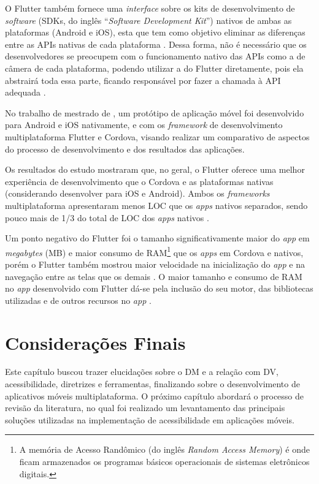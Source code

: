 O Flutter também fornece uma \emph{interface} sobre os kits de desenvolvimento de \emph{software} (SDKs, do inglês ``\emph{Software Development Kit}'')
nativos de ambas as plataformas (Android e iOS), esta que tem como objetivo eliminar as diferenças entre as APIs nativas de cada plataforma \cite{zammetti2019practical}.
Dessa forma, não é necessário que os desenvolvedores se preocupem com o funcionamento nativo das APIs como a de câmera de cada plataforma, podendo utilizar
a do Flutter diretamente, pois ela abstrairá toda essa parte, ficando responsável por fazer a chamada à API adequada \cite{zammetti2019practical}.

No trabalho de mestrado de , um protótipo de aplicação móvel foi desenvolvido para Android e iOS nativamente, e com os
\emph{framework} de desenvolvimento multiplataforma Flutter e Cordova, visando realizar um comparativo de
aspectos do processo de desenvolvimento e dos resultados das aplicações. 

Os resultados do estudo mostraram que, no geral, o Flutter oferece uma melhor experiência de desenvolvimento que o Cordova e as plataformas nativas
(considerando desenvolver para iOS e Android). Ambos os \emph{frameworks} multiplataforma apresentaram menos LOC que os \emph{apps} nativos separados,
sendo pouco mais de 1/3 do total de LOC dos \emph{apps} nativos \cite{gonsalves2019evaluating}.

Um ponto negativo do Flutter foi o tamanho significativamente maior do \emph{app} em \emph{megabytes} (MB)
e maior consumo de RAM\footnote{A memória de Acesso Randômico (do inglês \emph{Random Access Memory}) é onde
ficam armazenados os programas básicos operacionais de sistemas eletrônicos digitais.}
que os \emph{apps} em Cordova e nativos, porém o Flutter também mostrou maior velocidade na inicialização do \emph{app} e na navegação entre as telas
que os demais \cite{gonsalves2019evaluating}. O maior tamanho e consumo de RAM no \emph{app} desenvolvido com Flutter dá-se pela inclusão do seu motor,
das bibliotecas utilizadas e de outros recursos no \emph{app} \cite{gonsalves2019evaluating,zammetti2019practical}.

\section{Considerações Finais}

Este capítulo buscou trazer elucidações sobre o DM e a relação com DV, acessibilidade, diretrizes e ferramentas,
finalizando sobre o desenvolvimento de aplicativos móveis multiplataforma.
O próximo capítulo abordará o processo de revisão da literatura, no qual foi realizado um levantamento das principais soluções
utilizadas na implementação de acessibilidade em aplicações móveis.